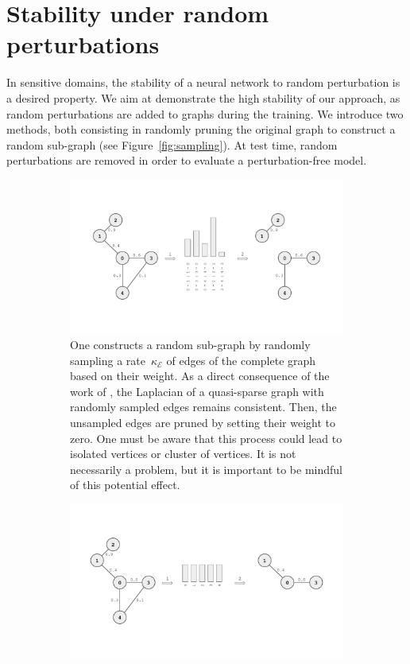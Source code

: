 \documentclass{article}
\begin{document}
\section{Stability under random perturbations}

In sensitive domains, the stability of a neural network to random perturbation is a desired property. We aim at demonstrate the high stability of our approach, as random perturbations are added to graphs during the training. We introduce two methods, both consisting in randomly pruning the original graph to construct a random sub-graph (see Figure~\ref{fig:sampling}). At test time, random perturbations are removed in order to evaluate a perturbation-free model.

\begin{figure}[h!]
    \centering
    \begin{subfigure}[t]{0.48\textwidth}
        \centering
        \includegraphics[width=\textwidth]{Images/edge_sampling.pdf}
        \caption{One constructs a random sub-graph by randomly sampling a rate~$\kappa_\mathcal{E}$ of edges of the complete graph based on their weight. As a direct consequence of the work of  \cite{keriven2020convergence}, the Laplacian of a quasi-sparse graph with randomly sampled edges remains consistent. Then, the unsampled edges are pruned by setting their weight to zero. One must be aware that this process could lead to isolated vertices or cluster of vertices. It is not necessarily a problem, but it is important to be mindful of this potential effect.}
    \end{subfigure}
    \hfill
    \begin{subfigure}[t]{0.48\textwidth}
        \centering
        \includegraphics[width=\textwidth]{Images/vertex_sampling.pdf}

\end{subfigure}
\end{figure}
\end{document}
